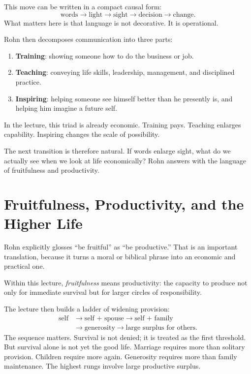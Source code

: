 This move can be written in a compact causal form:
\begin{equation}
\text{words} \to \text{light} \to \text{sight} \to \text{decision} \to \text{change}.
\end{equation}
What matters here is that language is not decorative. It is operational.

Rohn then decomposes communication into three parts:
\begin{enumerate}
\item \textbf{Training}: showing someone how to do the business or job.
\item \textbf{Teaching}: conveying life skills, leadership, management, and disciplined practice.
\item \textbf{Inspiring}: helping someone see himself better than he presently is, and helping him imagine a future self.
\end{enumerate}
In the lecture, this triad is already economic. Training pays. Teaching enlarges capability. Inspiring changes the scale of possibility.

The next transition is therefore natural. If words enlarge sight, what do we actually see when we look at life economically? Rohn answers with the language of fruitfulness and productivity.

\section{Fruitfulness, Productivity, and the Higher Life}

Rohn explicitly glosses ``be fruitful'' as ``be productive.'' That is an important translation, because it turns a moral or biblical phrase into an economic and practical one.

\begin{definition}
Within this lecture, \emph{fruitfulness} means productivity: the capacity to produce not only for immediate survival but for larger circles of responsibility.
\end{definition}

The lecture then builds a ladder of widening provision:
\begin{align}
\text{self} &\to \text{self + spouse} \to \text{self + family} \\
&\to \text{generosity} \to \text{large surplus for others}.
\end{align}
The sequence matters. Survival is not denied; it is treated as the first threshold. But survival alone is not yet the good life. Marriage requires more than solitary provision. Children require more again. Generosity requires more than family maintenance. The highest rungs involve large productive surplus.

